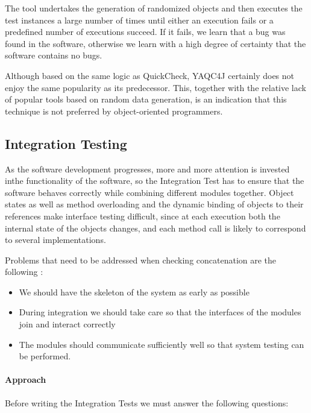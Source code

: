\documentclass[12pt]{article}
\begin{document}
\par The tool undertakes the generation of randomized objects and then executes the test instances a large number of times until either an execution fails or a predefined number of executions succeed. If it fails, we learn that a bug was found in the software, otherwise we learn with a high degree of certainty that the software contains no bugs.

\par Although based on the same logic as QuickCheck, YAQC4J certainly does not enjoy the same popularity as its predecessor. This, together with the relative lack of popular tools based on random data generation, is an indication that this technique is not preferred by object-oriented programmers.

\subsection{Integration Testing} 

As the software development progresses, more and more attention is invested inthe functionality of the software, so the Integration Test has to ensure that the software behaves correctly while combining different modules together. Object states as well as method overloading and the dynamic binding of objects to their references make interface testing difficult, since at each execution both the internal state of the objects changes, and each method call is likely to correspond to several implementations.

\par Problems that need to be addressed when checking concatenation are the following \cite{bashir}:

\begin{itemize}
\item We should have the skeleton of the system as early as possible
\item During integration we should take care so that the interfaces of the modules join and interact correctly
\item The modules should communicate sufficiently well so that system testing can be performed.
\end{itemize}

\paragraph{Approach}

Before writing the Integration Tests we must answer the following questions:
\end{document}
